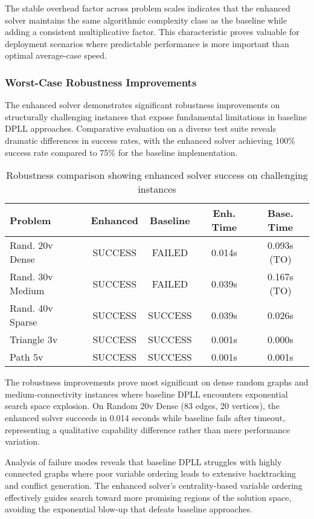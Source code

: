 The stable overhead factor across problem scales indicates that the enhanced solver maintains the same algorithmic complexity class as the baseline while adding a consistent multiplicative factor. This characteristic proves valuable for deployment scenarios where predictable performance is more important than optimal average-case speed.

\subsubsection{Worst-Case Robustness Improvements}

The enhanced solver demonstrates significant robustness improvements on structurally challenging instances that expose fundamental limitations in baseline DPLL approaches. Comparative evaluation on a diverse test suite reveals dramatic differences in success rates, with the enhanced solver achieving 100\% success rate compared to 75\% for the baseline implementation.

\begin{table}[h]
\centering
\small
\begin{tabular}{|l|c|c|c|c|}
\hline
\textbf{Problem} & \textbf{Enhanced} & \textbf{Baseline} & \textbf{Enh. Time} & \textbf{Base. Time} \\
\hline
Rand. 20v Dense & SUCCESS & FAILED & 0.014s & 0.093s (TO) \\
Rand. 30v Medium & SUCCESS & FAILED & 0.039s & 0.167s (TO) \\
Rand. 40v Sparse & SUCCESS & SUCCESS & 0.039s & 0.026s \\
Triangle 3v & SUCCESS & SUCCESS & 0.001s & 0.000s \\
Path 5v & SUCCESS & SUCCESS & 0.001s & 0.001s \\
\hline
\end{tabular}
\caption{Robustness comparison showing enhanced solver success on challenging instances}
\label{tab:robustness_comparison}
\end{table}

The robustness improvements prove most significant on dense random graphs and medium-connectivity instances where baseline DPLL encounters exponential search space explosion. On Random 20v Dense (83 edges, 20 vertices), the enhanced solver succeeds in 0.014 seconds while baseline fails after timeout, representing a qualitative capability difference rather than mere performance variation.

Analysis of failure modes reveals that baseline DPLL struggles with highly connected graphs where poor variable ordering leads to extensive backtracking and conflict generation. The enhanced solver's centrality-based variable ordering effectively guides search toward more promising regions of the solution space, avoiding the exponential blow-up that defeats baseline approaches.

